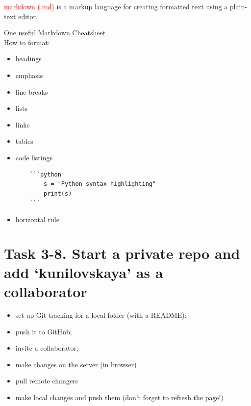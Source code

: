 \documentclass[a4paper,11pt]{article}
\begin{document}
\textcolor{red}{markdown (.md)} is a markup language for creating formatted text using a plain-text editor.

One useful \href{https://github.com/adam-p/markdown-here/wiki/Markdown-Cheatsheet}{Markdown Cheatsheet} \\

How to format:
\begin{itemize}
	\item headings
	\item emphasis
	\item line breaks
	\item lists
	\item links
	\item tables
	\item code listings\\
	\begin{lstlisting}
	```python
		s = "Python syntax highlighting"
		print(s)
	```
	\end{lstlisting}
	\item horizontal rule
	
\end{itemize}

\section*{Task 3-8. Start a private repo and add `kunilovskaya' as a collaborator}
\label{task}

\begin{tcolorbox}[width=\textwidth, colback={yellow!40!white}, title={}, colbacktitle=yellow!60!white, coltitle=black]
	\begin{itemize}
		\item set up Git tracking for a local folder (with a README);
		\item push it to GitHub;  
		\item invite a collaborator;
		\item make changes on the server (in browser)
		\item pull remote changers
		\item make local changes and push them (don't forget to refresh the page!)
	\end{itemize}
	
\end{tcolorbox}%
\end{document}
